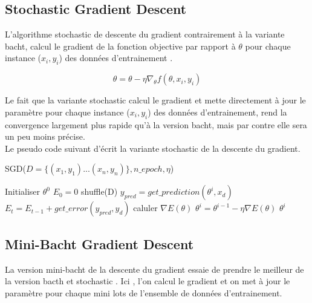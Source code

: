 \documentclass[12pt,a4paper]{article}
\begin{document}
\vspace{0.2in}

\subsection{Stochastic Gradient Descent}

L'algorithme stochastic de descente du gradient contrairement à la variante bacht, calcul le gradient de la fonction objective par rapport à $\theta$ pour chaque instance ($x_{i}, y_{i}$) des données d'entrainement .
\vspace{0.2in}
\begin{large}
\begin{equation}
\theta = \theta - \eta \nabla_{\theta}f(\theta, x_{i}, y_{i})
\end{equation}
\end{large}

Le fait que la variante stochastic calcul le gradient et mette directement à jour le paramètre pour chaque instance ($x_{i}, y_{i}$) des données d'entrainement, rend la convergence largement plus rapide qu'à la version bacht, mais par contre elle sera un peu moins précise. \\
Le pseudo code suivant d'écrit la variante stochastic de la descente du gradient.

\begin{center}
\begin{algorithm}[H]
\caption{SGD($ D = \lbrace (x_{1},y_{1})...(x_{n},y_{n}) \rbrace, n\_epoch, \eta$)}
\begin{algorithmic} 
\STATE Initialiser $\theta^{0}$
\STATE $E_{0} = 0$
\STATE shuffle(D)
\STATE $y_{pred} = get\_prediction(\theta^{i}, x_{d})$
\STATE $E_{t} = E_{t-1} + get\_error(y_{pred}, y_{d})$
\STATE caluler $\nabla E(\theta )$
\STATE $\theta^{i} = \theta^{i-1} - \eta\nabla E(\theta ) $
\ENDFOR
\ENDFOR
\RETURN $\theta^{i}$
\end{algorithmic}
\end{algorithm}
\end{center}

\vspace{0.2in}

\subsection{Mini-Bacht Gradient Descent}
La version mini-bacht de la descente du gradient essaie de prendre le meilleur de la version bacth et stochastic . Ici , l'on calcul le gradient et on met à jour le paramètre pour chaque mini lots de l'ensemble de données d'entrainement.
\end{document}

